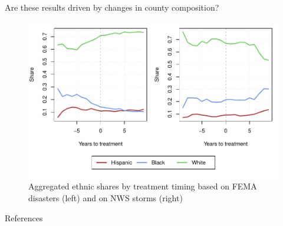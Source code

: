 \documentclass[hyperref={colorlinks = true,linkcolor = blue, citecolor=blue,urlcolor=blue}]{beamer}
\begin{document}
\begin{frame}{Are these results driven by changes in county composition?}
	
	\begin{figure}[!h]
		\centering
		\includegraphics[scale=0.6]{"../Code & Data/EthnicComposition.pdf"}
		\caption{Aggregated ethnic shares by treatment timing based on FEMA disasters (left) and on NWS storms (right)}
		\label{EthnicComposition}
	\end{figure}
\end{frame}






\begin{frame}{References}
	
	
\end{frame}
\end{document}

